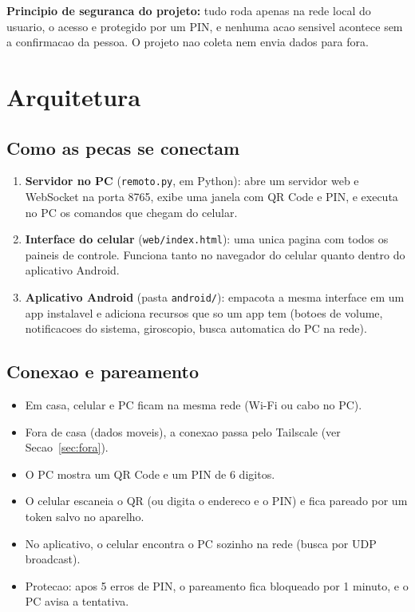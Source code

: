 \documentclass[11pt,a4paper]{article}
\begin{document}
\begin{nota}
\textbf{Principio de seguranca do projeto:} tudo roda apenas na rede local do usuario,
o acesso e protegido por um PIN, e nenhuma acao sensivel acontece sem a confirmacao
da pessoa. O projeto nao coleta nem envia dados para fora.
\end{nota}

\section{Arquitetura}

\subsection{Como as pecas se conectam}

\begin{enumerate}
  \item \textbf{Servidor no PC} (\texttt{remoto.py}, em Python): abre um servidor web
  e WebSocket na porta 8765, exibe uma janela com QR Code e PIN, e executa no PC os
  comandos que chegam do celular.
  \item \textbf{Interface do celular} (\texttt{web/index.html}): uma unica pagina com
  todos os paineis de controle. Funciona tanto no navegador do celular quanto dentro
  do aplicativo Android.
  \item \textbf{Aplicativo Android} (pasta \texttt{android/}): empacota a mesma interface
  em um app instalavel e adiciona recursos que so um app tem (botoes de volume,
  notificacoes do sistema, giroscopio, busca automatica do PC na rede).
\end{enumerate}

\subsection{Conexao e pareamento}

\begin{itemize}
  \item Em casa, celular e PC ficam na mesma rede (Wi-Fi ou cabo no PC).
  \item Fora de casa (dados moveis), a conexao passa pelo Tailscale (ver
  Secao~\ref{sec:fora}).
  \item O PC mostra um QR Code e um PIN de 6 digitos.
  \item O celular escaneia o QR (ou digita o endereco e o PIN) e fica pareado por um
  token salvo no aparelho.
  \item No aplicativo, o celular encontra o PC sozinho na rede (busca por UDP broadcast).
  \item Protecao: apos 5 erros de PIN, o pareamento fica bloqueado por 1 minuto, e o PC
  avisa a tentativa.
\end{itemize}
\end{document}
